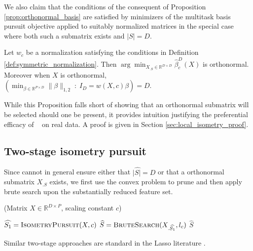 We also claim that the conditions of the consequent of Proposition \ref{prop:orthonormal_basis} are satisfied by minimizers of the multitask basis pursuit objective applied to suitably normalized matrices in the special case where both such a submatrix exists and $| S| = D$.
\begin{proposition}
Let $w_c$ be a normalization satisfying the conditions in Definition \ref{def:symmetric_normalization}.
Then $\arg \min_{X_{.S} \in \mathbb R^{D \times D}} \widehat \beta^{D}_c ( X) $ is orthonormal.
Moreover when $X$ is orthonormal, $(\min_{\beta \in \mathbb R^{P \times D}} \| \beta \|_{1,2} \; : \; I_D = w ({  X}, c) \beta) = D$.
\label{prop:unitary_selection}
\end{proposition}
While this Proposition falls short of showing that an orthonormal submatrix will be selected should one be present, it provides intuition justifying the preferential efficacy of \isometrypursuit~ on real data.
A proof is given in Section \ref{sec:local_isometry_proof}.

\subsection{Two-stage isometry pursuit}

Since cannot in general ensure either that $|\widehat {  S|} = D$ or that a orthonormal submatrix $X_{.S}$ exists, we first use the convex problem to prune and then apply brute search upon the substantially reduced feature set.

\begin{algorithm}[H]
\caption{\tsip(Matrix ${X} \in \mathbb{R}^{D \times P}$, scaling constant $c$)}
\begin{algorithmic}[1]
\STATE $\widehat{S_1} = \text{{\sc IsometryPursuit}}( X, c)$
\STATE $\widehat{S} = \text {{\sc BruteSearch}}({X}_{.\widehat{S_1}}, l_c)$
 $\widehat{S}$
\end{algorithmic}
\end{algorithm}

Similar two-stage approaches are standard in the Lasso literature \cite{Hesterberg2008-iy}.